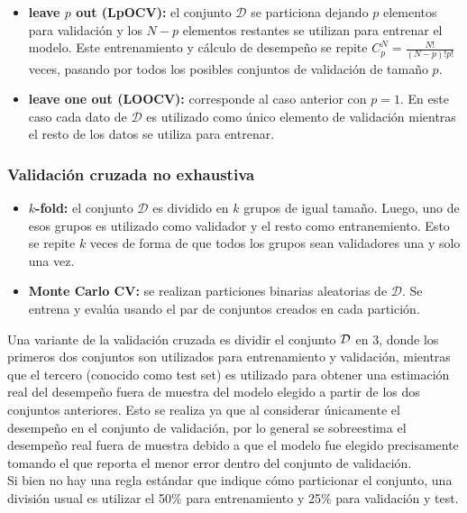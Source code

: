 \begin{itemize}
	\item \textbf{leave $p$ out (LpOCV):} el conjunto $\mathcal{D}$ se particiona dejando $p$ elementos para validación y los $N-p$ elementos restantes se utilizan para entrenar el modelo. Este entrenamiento y cálculo de desempeño se repite $C_p^N=\frac{N!}{(N-p)!p!}$ veces, pasando por todos los posibles conjuntos de validación de tamaño $p$.
	\item \textbf{leave one out (LOOCV):} corresponde al caso anterior con $p=1$. En este caso cada dato de $\mathcal{D}$ es utilizado como único elemento de validación mientras el resto de los datos se utiliza para entrenar.
\end{itemize}

\subsubsection{Validación cruzada no exhaustiva}

\begin{itemize}
	\item \textbf{$k$-fold:} el conjunto $\mathcal{D}$ es dividido en $k$ grupos de igual tamaño. Luego, uno de esos grupos es utilizado como validador y el resto como entranemiento. Esto se repite $k$ veces de forma de que todos los grupos sean validadores una y solo una vez.
	\item \textbf{Monte Carlo CV:} se realizan particiones binarias aleatorias de $\mathcal{D}$. Se entrena y evalúa usando el par de conjuntos creados en cada partición.
\end{itemize}

\begin{remark}
Una variante de la validación cruzada es dividir el conjunto ${\mathcal D}$ en 3, donde los primeros dos conjuntos son utilizados para entrenamiento y validación, mientras que el tercero (conocido como test set) es utilizado para obtener una estimación real del desempeño fuera de muestra del modelo elegido a partir de los dos conjuntos anteriores. Esto se realiza ya que al considerar únicamente el desempeño en el conjunto de validación, por lo general se sobreestima el desempeño real fuera de muestra debido a que el modelo fue elegido precisamente tomando el que reporta el menor error dentro del conjunto de validación.\\

Si bien no hay una regla estándar que indique cómo particionar el conjunto, una división usual es utilizar el 50\% para entrenamiento y 25\% para validación y test.
\end{remark}

